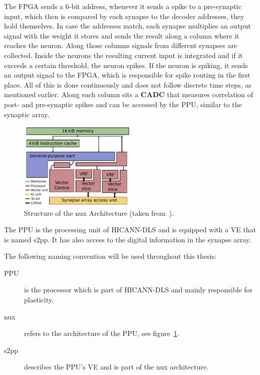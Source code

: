 The \ac{FPGA} sends a 6-bit address, whenever it sends a spike to a pre-synaptic input, which then is compared by each synapse to the decoder addresses, they hold themselves.
In case the addresses match, each synapse multiplies an output signal with the weight it stores and sends the result along a column where it reaches the neuron.
Along those columns signals from different synapses are collected.
Inside the neurons the resulting current input is integrated and if it exceeds a certain threshold, the neuron spikes.
If the neuron is spiking, it sends an output signal to the FPGA, which is responsible for spike routing in the first place.
All of this is done continuously and does not follow discrete time steps, as mentioned earlier.
Along each column sits a \textbf{\ac{CADC}} that measures correlation of post- and pre-synaptic spikes and can be accessed by the \ac{PPU}, similar to the synaptic array.
\begin{figure}
\captionsetup{format=plain, indention=.6cm, labelsep=newline,singlelinecheck=false}
    \centering
    \includegraphics[width=0.5\textwidth]{pictures/nux.pdf}
    \caption{\label{fig:nux} Structure of the nux Architecture (taken from~\citeauthor{PPU}).}
\end{figure}
The \ac{PPU} is the processing unit of \ac{HICANN-DLS} and is equipped with a \ac{VE} that is named \ac{s2pp}.
It has also access to the digital information in the synapse array.

The following naming convention will be used throughout this thesis:
\begin{description}
    \item[\ac{PPU}] is the processor which is part of \ac{HICANN-DLS} and mainly responsible for plasticity.
    \item[nux] refers to the architecture of the \ac{PPU}, see figure~\ref{fig:nux}.
    \item[\ac{s2pp}] describes the \ac{PPU}'s \ac{VE} and is part of the nux architecture.
\end{description}

